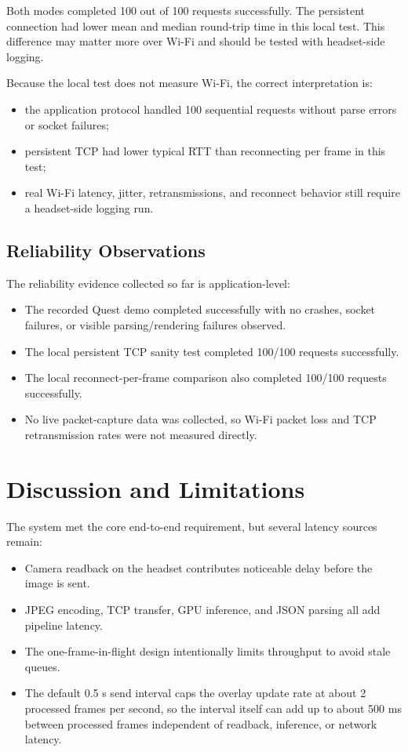 \documentclass[11pt]{article}
\begin{document}
Both modes completed 100 out of 100 requests successfully. The persistent connection had lower mean and median round-trip time in this local test. This difference may matter more over Wi-Fi and should be tested with headset-side logging.

Because the local test does not measure Wi-Fi, the correct interpretation is:

\begin{itemize}
    \item the application protocol handled 100 sequential requests without parse errors or socket failures;
    \item persistent TCP had lower typical RTT than reconnecting per frame in this test;
    \item real Wi-Fi latency, jitter, retransmissions, and reconnect behavior still require a headset-side logging run.
\end{itemize}

\subsection{Reliability Observations}

The reliability evidence collected so far is application-level:

\begin{itemize}
    \item The recorded Quest demo completed successfully with no crashes, socket failures, or visible parsing/rendering failures observed.
    \item The local persistent TCP sanity test completed 100/100 requests successfully.
    \item The local reconnect-per-frame comparison also completed 100/100 requests successfully.
    \item No live packet-capture data was collected, so Wi-Fi packet loss and TCP retransmission rates were not measured directly.
\end{itemize}

\section{Discussion and Limitations}

The system met the core end-to-end requirement, but several latency sources remain:

\begin{itemize}
    \item Camera readback on the headset contributes noticeable delay before the image is sent.
    \item JPEG encoding, TCP transfer, GPU inference, and JSON parsing all add pipeline latency.
    \item The one-frame-in-flight design intentionally limits throughput to avoid stale queues.
    \item The default 0.5 s send interval caps the overlay update rate at about 2 processed frames per second, so the interval itself can add up to about 500 ms between processed frames independent of readback, inference, or network latency.
\end{itemize}
\end{document}

